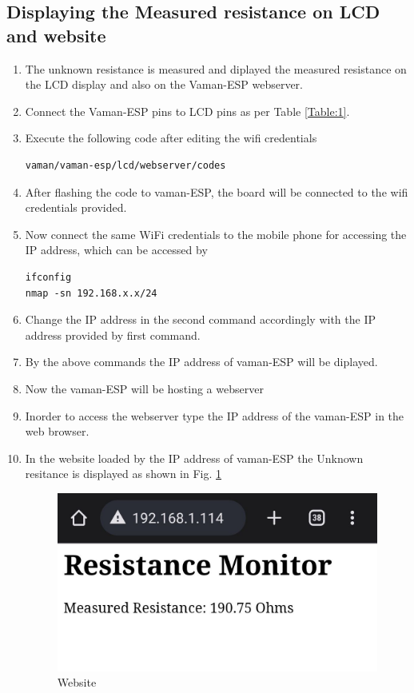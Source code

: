 \subsection{Displaying the Measured resistance on LCD and website}
\begin{enumerate}[label=\thesection.\arabic*.,ref=\thesection.\theenumi]
\item The unknown resistance is measured and diplayed the measured resistance on the LCD display and also on the Vaman-ESP webserver.
\item Connect the Vaman-ESP pins to LCD pins as per Table \ref{Table:1}.
\item
Execute the following code after editing the wifi credentials

\begin{lstlisting}
vaman/vaman-esp/lcd/webserver/codes
\end{lstlisting}
\item After flashing the code to vaman-ESP, the board will be connected to the wifi credentials provided.
\item Now connect the same WiFi credentials to the mobile phone for accessing the IP address, which can be accessed by 
\begin{lstlisting}
ifconfig
nmap -sn 192.168.x.x/24
\end{lstlisting}
\item Change the IP address in the second command accordingly with the IP address provided by first command.
\item By the above commands the IP address of vaman-ESP will be diplayed.
\item Now the vaman-ESP will be hosting a webserver
\item Inorder to access the webserver type the IP address of the vaman-ESP in the web browser.
\item In the website loaded by the IP address of vaman-ESP the Unknown resitance is displayed as shown in Fig. \ref{fig:website}

\begin{figure}[!ht]
\centering
\includegraphics[width=\columnwidth]{vaman-esp32/lcd/figs/website.jpg}
\caption{Website}
\label{fig:website}
\end{figure}
\end{enumerate}

